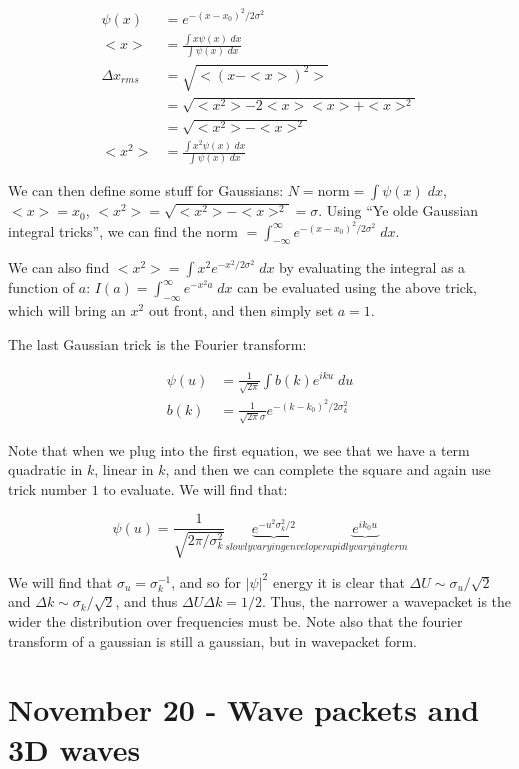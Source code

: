 \documentclass{report}
\begin{document}
\begin{align*}
\psi(x) &= e^{-(x-x_0)^2/2\sigma^2}\\
<x> &= \frac{\int{x\psi(x)\;dx}}{\int{\psi(x)\;dx}}\\
\Delta x_{rms} &= \sqrt{<(x-<x>)^2>}\\
&= \sqrt{<x^2>-2<x><x> + <x>^2}\\
&= \sqrt{<x^2> - <x>^2}\\
<x^2> &= \frac{\int{x^2\psi(x)\;dx}}{\int{\psi(x)\;dx}}
\end{align*}

We can then define some stuff for Gaussians: $N = \mathrm{norm} = \int{\psi(x)\;dx}$, $<x> = x_0$, $<x^2> = \sqrt{<x^2> - <x>^2} = \sigma$. Using ``Ye olde Gaussian integral tricks'', we can find the norm $= \int_{-\infty}^\infty{e^{-(x-x_0)^2/2\sigma^2}\;dx}$.

We can also find $<x^2> = \int{x^2e^{-x^2/2\sigma^2}\;dx}$ by evaluating the integral as a function of $a$: $I(a) = \int_{-\infty}^\infty{e^{-x^2a}\;dx}$ can be evaluated using the above trick, which will bring an $x^2$ out front, and then simply set $a = 1$.

The last Gaussian trick is the Fourier transform:

\begin{align*}
\psi(u) &= \frac{1}{\sqrt{2\pi}}\int{b(k)e^{iku}\;du}\\
b(k) &= \frac{1}{\sqrt{2\pi}\sigma} e^{-(k-k_0)^2/2\sigma_k^2}
\end{align*}

Note that when we plug into the first equation, we see that we have a term quadratic in $k$, linear in $k$, and then we can complete the square and again use trick number $1$ to evaluate. We will find that:

$$\psi(u)=\frac{1}{\sqrt{2\pi/\sigma_k^2}}\underbrace{e^{-u^2\sigma_k^2/2}}_{slowly varying envelope}\underbrace{e^{ik_0u}}_{rapidly varying term}$$

We will find that $\sigma_u = \sigma_k^{-1}$, and so for $|\psi|^2$ energy it is clear that $\Delta U \sim \sigma_u/\sqrt{2}$ and $\Delta k \sim \sigma_k/\sqrt{2}$, and thus $\Delta U \Delta k = 1/2$. Thus, the narrower a wavepacket is the wider the distribution over frequencies must be. Note also that the fourier transform of a gaussian is still a gaussian, but in wavepacket form.

\chapter{November 20 - Wave packets and 3D waves}
\end{document}
